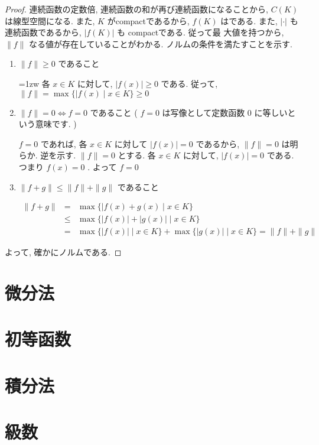 \documentclass[dvipdfmx,uplatex,11pt]{jsarticle}
\begin{document}
\begin{leftbar}
	\begin{proof}
	連続函数の定数倍, 連続函数の和が再び連続函数になることから, $C ( K )$ は線型空間になる. また, $K$ がcompactであるから, $f ( K )$ はである. また, $| \cdot |$ も連続函数であるから, $| f ( K ) |$ も compactである. 従って最
	大値を持つから, $\| f \|$ なる値が存在していることがわかる. ノルムの条件を満たすことを示す. 
		\begin{enumerate}
			\item $\| f \| \geq 0$ であること
				
				\parindent=1zw 各 $x \in K$ に対して, $| f ( x ) | \geq 0$ である. 従って, $\| f \| = \max \{ | f ( x ) \mid x \in K \} \geq 0$
				
			\item $\| f \| = 0 \Leftrightarrow f = 0$ であること ( $f = 0$ は写像として定数函数 $0$ に等しいという意味です. )	
				
				$f = 0$ であれば, 各 $x \in K$ に対して $| f ( x ) | = 0$ であるから, $\| f \| = 0$ は明らか. 逆を示す. $\| f \| = 0$ とする. 各 $x \in K$ に対して, $| f ( x ) | = 0$ である. つまり $f ( x ) = 0$ . よって $f = 0$
				
			\item $\| f + g \| \leq \| f \| + \| g \|$ であること
			
				\begin{eqnarray*}
					\| f + g \| & = & \max \{ | f ( x ) + g ( x ) \mid x \in K \} \\
					& \leq & \max \{ | f ( x ) | + | g ( x ) | \mid x \in K \} \\
					& = & \max \{ | f ( x ) |  \mid x \in K \} + \max \{ | g ( x ) |  \mid x \in K \} = \| f \| + \| g \|
				\end{eqnarray*}
		\end{enumerate}
	よって, 確かにノルムである. 
\end{proof}
\end{leftbar}
\newpage
\section{微分法}

\newpage

\section{初等函数}

\newpage

\section{積分法}

\newpage

\section{級数}
\end{document}
